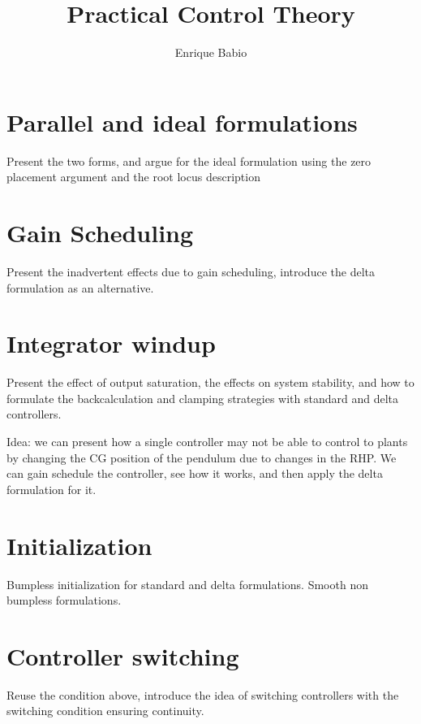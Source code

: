 \documentclass{article}
\title{Practical Control Theory}
\author{Enrique Babio}
\begin{document}
	
	\maketitle
	
	
	
	\section{Parallel and ideal formulations}
	Present the two forms, and argue for the ideal formulation using the zero placement argument and the root locus description
	
	\section{Gain Scheduling}
	Present the inadvertent effects due to gain scheduling, introduce the delta formulation as an alternative.
	
	\section{Integrator windup}
	Present the effect of output saturation, the effects on system stability, and how to formulate the backcalculation and clamping strategies with standard and delta controllers.
	
	Idea: we can present how a single controller may not be able to control to plants by changing the CG position of the pendulum due to changes in the RHP. We can gain schedule the controller, see how it works, and then apply the delta formulation for it.
	
	\section{Initialization}
	Bumpless initialization for standard and delta formulations. Smooth non bumpless formulations.
	
	\section{Controller switching}
	Reuse the condition above, introduce the idea of switching controllers with the switching condition ensuring continuity.
	
	\newpage
	\begin{appendices}
		
	\end{appendices}
	
	
	
\end{document}
